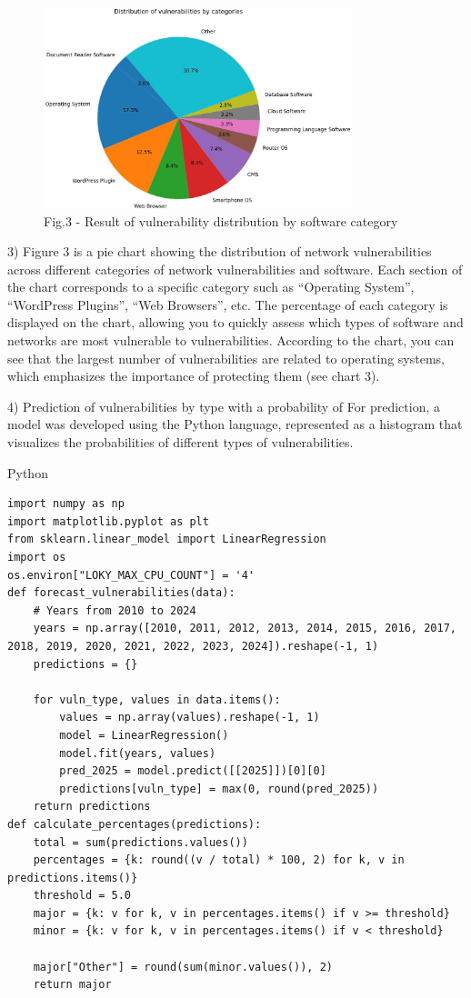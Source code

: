 \begin{figure}[H]
	\centering
	\includegraphics[width=0.8\textwidth]{media/ict2/image166}
	\caption*{Fig.3 - Result of vulnerability distribution by software category}
\end{figure}

\begin{multicols}{2}
3) Figure 3 is a pie chart showing the distribution of network
vulnerabilities across different categories of network vulnerabilities
and software. Each section of the chart corresponds to a specific
category such as ``Operating System'', ``WordPress Plugins'', ``Web
Browsers'', etc. The percentage of each category is displayed on the
chart, allowing you to quickly assess which types of software and
networks are most vulnerable to vulnerabilities. According to the
chart, you can see that the largest number of vulnerabilities are
related to operating systems, which emphasizes the importance of
protecting them (see chart 3).

4) Prediction of vulnerabilities by type with a probability of
For prediction, a model was developed using the Python language,
represented as a histogram that visualizes the probabilities of
different types of vulnerabilities.
\end{multicols}

Python

\begin{lstlisting}
import numpy as np
import matplotlib.pyplot as plt
from sklearn.linear_model import LinearRegression
import os
os.environ["LOKY_MAX_CPU_COUNT"] = '4'
def forecast_vulnerabilities(data):
    # Years from 2010 to 2024
    years = np.array([2010, 2011, 2012, 2013, 2014, 2015, 2016, 2017, 2018, 2019, 2020, 2021, 2022, 2023, 2024]).reshape(-1, 1)
    predictions = {}

    for vuln_type, values in data.items():
        values = np.array(values).reshape(-1, 1)
        model = LinearRegression()
        model.fit(years, values)
        pred_2025 = model.predict([[2025]])[0][0]
        predictions[vuln_type] = max(0, round(pred_2025))
    return predictions
def calculate_percentages(predictions):
    total = sum(predictions.values())
    percentages = {k: round((v / total) * 100, 2) for k, v in predictions.items()}
    threshold = 5.0
    major = {k: v for k, v in percentages.items() if v >= threshold}
    minor = {k: v for k, v in percentages.items() if v < threshold}

    major["Other"] = round(sum(minor.values()), 2)
    return major
\end{lstlisting}

